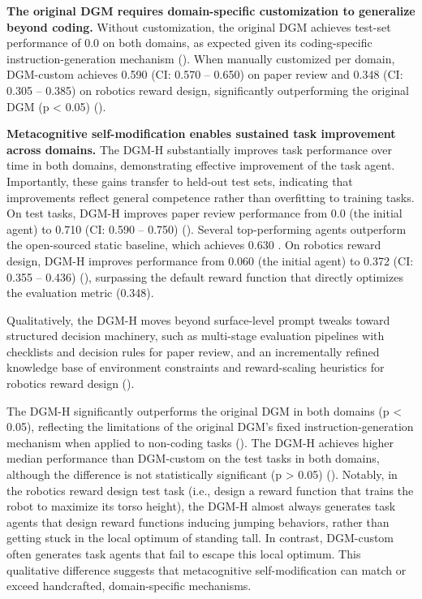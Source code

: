 \documentclass{article}
\begin{document}
\textbf{The original DGM requires domain-specific customization to generalize beyond coding.} Without customization, the original DGM achieves test-set performance of 0.0 on both domains, as expected given its coding-specific instruction-generation mechanism (). When manually customized per domain, DGM-custom achieves 0.590 (CI: 0.570 -- 0.650) on paper review and 0.348 (CI: 0.305 -- 0.385) on robotics reward design, significantly outperforming the original DGM (p < 0.05) ().

\textbf{Metacognitive self-modification enables sustained task improvement across domains.} The DGM-H substantially improves task performance over time in both domains, demonstrating effective improvement of the task agent. Importantly, these gains transfer to held-out test sets, indicating that improvements reflect general competence rather than overfitting to training tasks. On test tasks, DGM-H improves paper review performance from 0.0 (the initial agent) to 0.710 (CI: 0.590 -- 0.750) (). Several top-performing agents outperform the open-sourced static baseline, which achieves 0.630 \citep{yamada2025ai}. On robotics reward design, DGM-H improves performance from 0.060 (the initial agent) to 0.372 (CI: 0.355 -- 0.436) (), surpassing the default reward function that directly optimizes the evaluation metric (0.348).

Qualitatively, the DGM-H moves beyond surface-level prompt tweaks toward structured decision machinery, such as multi-stage evaluation pipelines with checklists and decision rules for paper review, and an incrementally refined knowledge base of environment constraints and reward-scaling heuristics for robotics reward design ().

The DGM-H significantly outperforms the original DGM in both domains (p < 0.05), reflecting the limitations of the original DGM's fixed instruction-generation mechanism when applied to non-coding tasks (). The DGM-H achieves higher median performance than DGM-custom on the test tasks in both domains, although the difference is not statistically significant (p > 0.05) (). Notably, in the robotics reward design test task (i.e., design a reward function that trains the robot to maximize its torso height), the DGM-H almost always generates task agents that design reward functions inducing jumping behaviors, rather than getting stuck in the local optimum of standing tall. In contrast, DGM-custom often generates task agents that fail to escape this local optimum. This qualitative difference suggests that metacognitive self-modification can match or exceed handcrafted, domain-specific mechanisms.
\end{document}

